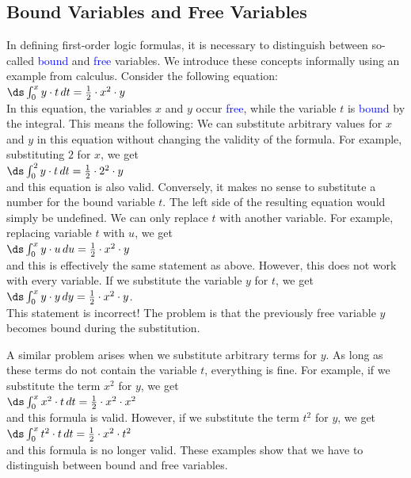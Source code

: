 \subsection{Bound Variables and Free Variables}
In defining first-order logic formulas, it is necessary
to distinguish between so-called \textcolor{blue}{bound} and \textcolor{blue}{free}
variables.
We introduce these concepts informally using an example from calculus.
Consider the following equation: \\[0.2cm]
\hspace*{1.3cm}
$\ds\int_{0}^{x} y \cdot t\, dt = \frac{1}{2} \cdot x^2 \cdot y$
\\[0.2cm]
In this equation, the variables $x$ and $y$ occur \textcolor{blue}{free}, while the variable $t$ is \textcolor{blue}{bound} by the integral.
This means the following: We can substitute arbitrary values for $x$ and $y$ in this equation without
changing the validity of the formula. For example, substituting $2$ for $x$, we get \\[0.2cm]
\hspace*{1.3cm}
$\ds\int_{0}^{2} y \cdot t\, dt = \frac{1}{2} \cdot 2^2 \cdot y$ \\[0.2cm]
and this equation is also valid. Conversely, it makes no sense to substitute a number for the bound variable
$t$.
The left side of the resulting equation would simply be undefined. We can only replace $t$
with another variable.
For example, replacing variable $t$ with $u$, we get \\[0.2cm]
\hspace*{1.3cm}
$\ds\int_{0}^{x} y \cdot u\, du = \frac{1}{2} \cdot x^2 \cdot y$
\\[0.2cm]
and this is effectively the same statement as above. However, this does not work with every variable. If we
substitute the variable $y$ for $t$, we get \\[0.2cm]
\hspace*{1.3cm}
$\ds\int_{0}^{x} y \cdot y\, dy = \frac{1}{2} \cdot x^2 \cdot y$. \\[0.2cm]
This statement is incorrect! The problem is that the previously free variable
$y$ becomes bound during the substitution.

A similar problem arises when we substitute arbitrary terms for $y$. As long as these terms do not contain the variable $t$,
everything is fine. For example, if we substitute the term $x^2$ for $y$, we get \\[0.2cm]
\hspace*{1.3cm}
$\ds\int_{0}^{x} x^2 \cdot t\, dt = \frac{1}{2} \cdot x^2 \cdot x^2$
\\[0.2cm]
and this formula is valid. However, if we substitute the term $t^2$ for $y$, we get \\[0.2cm]
\hspace*{1.3cm}
$\ds\int_{0}^{x} t^2 \cdot t\, dt = \frac{1}{2} \cdot x^2 \cdot t^2$
\\[0.2cm]
and this formula is no longer valid.  These examples show that we have to distinguish between bound and free
variables. 

